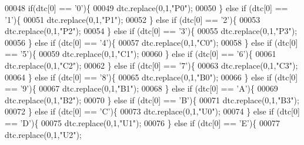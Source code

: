 \begin{DoxyCode}
00048     \textcolor{keywordflow}{if}(dtc[0] == \textcolor{charliteral}{'0'})\{
00049         dtc.replace(0,1,\textcolor{stringliteral}{"P0"});
00050     \} \textcolor{keywordflow}{else} \textcolor{keywordflow}{if} (dtc[0] == \textcolor{charliteral}{'1'})\{
00051         dtc.replace(0,1,\textcolor{stringliteral}{"P1"});
00052     \} \textcolor{keywordflow}{else} \textcolor{keywordflow}{if} (dtc[0] == \textcolor{charliteral}{'2'})\{
00053         dtc.replace(0,1,\textcolor{stringliteral}{"P2"});
00054     \} \textcolor{keywordflow}{else} \textcolor{keywordflow}{if} (dtc[0] == \textcolor{charliteral}{'3'})\{
00055         dtc.replace(0,1,\textcolor{stringliteral}{"P3"});
00056     \} \textcolor{keywordflow}{else} \textcolor{keywordflow}{if} (dtc[0] == \textcolor{charliteral}{'4'})\{
00057         dtc.replace(0,1,\textcolor{stringliteral}{"C0"});
00058     \} \textcolor{keywordflow}{else} \textcolor{keywordflow}{if} (dtc[0] == \textcolor{charliteral}{'5'})\{
00059         dtc.replace(0,1,\textcolor{stringliteral}{"C1"});
00060     \} \textcolor{keywordflow}{else} \textcolor{keywordflow}{if} (dtc[0] == \textcolor{charliteral}{'6'})\{
00061         dtc.replace(0,1,\textcolor{stringliteral}{"C2"});
00062     \} \textcolor{keywordflow}{else} \textcolor{keywordflow}{if} (dtc[0] == \textcolor{charliteral}{'7'})\{
00063         dtc.replace(0,1,\textcolor{stringliteral}{"C3"});
00064     \} \textcolor{keywordflow}{else} \textcolor{keywordflow}{if} (dtc[0] == \textcolor{charliteral}{'8'})\{
00065         dtc.replace(0,1,\textcolor{stringliteral}{"B0"});
00066     \} \textcolor{keywordflow}{else} \textcolor{keywordflow}{if} (dtc[0] == \textcolor{charliteral}{'9'})\{
00067         dtc.replace(0,1,\textcolor{stringliteral}{"B1"});
00068     \} \textcolor{keywordflow}{else} \textcolor{keywordflow}{if} (dtc[0] == \textcolor{charliteral}{'A'})\{
00069         dtc.replace(0,1,\textcolor{stringliteral}{"B2"});
00070     \} \textcolor{keywordflow}{else} \textcolor{keywordflow}{if} (dtc[0] == \textcolor{charliteral}{'B'})\{
00071         dtc.replace(0,1,\textcolor{stringliteral}{"B3"});
00072     \} \textcolor{keywordflow}{else} \textcolor{keywordflow}{if} (dtc[0] == \textcolor{charliteral}{'C'})\{
00073         dtc.replace(0,1,\textcolor{stringliteral}{"U0"});
00074     \} \textcolor{keywordflow}{else} \textcolor{keywordflow}{if} (dtc[0] == \textcolor{charliteral}{'D'})\{
00075         dtc.replace(0,1,\textcolor{stringliteral}{"U1"});
00076     \} \textcolor{keywordflow}{else} \textcolor{keywordflow}{if} (dtc[0] == \textcolor{charliteral}{'E'})\{
00077         dtc.replace(0,1,\textcolor{stringliteral}{"U2"});

\end{DoxyCode}
